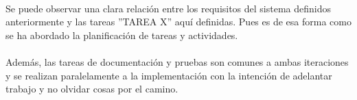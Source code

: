 \paragraph{} Se puede observar una clara relación entre los requisitos del sistema definidos anteriormente y las tareas ''TAREA X'' aquí definidas. Pues es de esa forma como se ha abordado la planificación de tareas y actividades.
\paragraph{}Además, las tareas de documentación y pruebas son comunes a ambas iteraciones y se realizan paralelamente a la implementación con la intención de adelantar trabajo y no olvidar cosas por el camino.